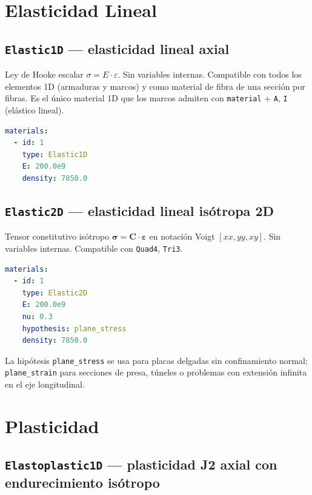 \documentclass[11pt,oneside]{report}
\begin{document}
\section{Elasticidad Lineal}

\subsection{\texttt{Elastic1D} --- elasticidad lineal axial}

Ley de Hooke escalar $\sigma = E \cdot \varepsilon$. Sin variables internas. Compatible con todos los elementos 1D (armaduras y marcos) y como material de fibra de una sección por fibras. Es el único material 1D que los marcos admiten con \texttt{material} + \texttt{A}, \texttt{I} (elástico lineal).

\begin{lstlisting}[language=yaml]
materials:
  - id: 1
    type: Elastic1D
    E: 200.0e9
    density: 7850.0

\end{lstlisting}

\subsection{\texttt{Elastic2D} --- elasticidad lineal isótropa 2D}

Tensor constitutivo isótropo $\boldsymbol\sigma = \mathbf C \cdot \boldsymbol\varepsilon$ en notación Voigt $[xx, yy, xy]$. Sin variables internas. Compatible con \texttt{Quad4}, \texttt{Tri3}.

\begin{lstlisting}[language=yaml]
materials:
  - id: 1
    type: Elastic2D
    E: 200.0e9
    nu: 0.3
    hypothesis: plane_stress
    density: 7850.0

\end{lstlisting}

La hipótesis \texttt{plane\_stress} se usa para placas delgadas sin confinamiento normal; \texttt{plane\_strain} para secciones de presa, túneles o problemas con extensión infinita en el eje longitudinal.

\section{Plasticidad}

\subsection{\texttt{Elastoplastic1D} --- plasticidad J2 axial con endurecimiento isótropo}
\end{document}
